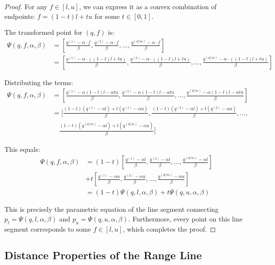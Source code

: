 \documentclass[numbers,sort]{article}
\begin{document}
\begin{proof}
For any $f \in [l, u]$, we can express it as a convex combination of endpoints: $f = (1-t)l + tu$ for some $t \in [0,1]$.

The transformed point for $(q, f)$ is:
\begin{align}
\Psi(q, f, \alpha, \beta) &= [\frac{q^{(1)} - \alpha \cdot f}{\beta}, \frac{q^{(2)} - \alpha \cdot f}{\beta}, ..., \frac{q^{(d/m)} - \alpha \cdot f}{\beta}] \\
&= [\frac{q^{(1)} - \alpha \cdot ((1-t)l + tu)}{\beta}, \frac{q^{(2)} - \alpha \cdot ((1-t)l + tu)}{\beta}, ..., \frac{q^{(d/m)} - \alpha \cdot ((1-t)l + tu)}{\beta}]
\end{align}

Distributing the terms:
\begin{align}
\Psi(q, f, \alpha, \beta) &= [\frac{q^{(1)} - \alpha(1-t)l - \alpha tu}{\beta}, \frac{q^{(2)} - \alpha(1-t)l - \alpha tu}{\beta}, ..., \frac{q^{(d/m)} - \alpha(1-t)l - \alpha tu}{\beta}] \\
&= [\frac{(1-t)(q^{(1)} - \alpha l) + t(q^{(1)} - \alpha u)}{\beta}, \frac{(1-t)(q^{(2)} - \alpha l) + t(q^{(2)} - \alpha u)}{\beta}, ...,\\
&\quad \frac{(1-t)(q^{(d/m)} - \alpha l) + t(q^{(d/m)} - \alpha u)}{\beta}]
\end{align}

This equals:
\begin{align}
\Psi(q, f, \alpha, \beta) &= (1-t)[\frac{q^{(1)} - \alpha l}{\beta}, \frac{q^{(2)} - \alpha l}{\beta}, ..., \frac{q^{(d/m)} - \alpha l}{\beta}] \\&+ t[\frac{q^{(1)} - \alpha u}{\beta}, \frac{q^{(2)} - \alpha u}{\beta}, ..., \frac{q^{(d/m)} - \alpha u}{\beta}] \\
&= (1-t)\Psi(q, l, \alpha, \beta) + t\Psi(q, u, \alpha, \beta)
\end{align}

This is precisely the parametric equation of the line segment connecting $p_l = \Psi(q, l, \alpha, \beta)$ and $p_u = \Psi(q, u, \alpha, \beta)$. Furthermore, every point on this line segment corresponds to some $f \in [l, u]$, which completes the proof.
\end{proof}

\subsection{Distance Properties of the Range Line}
\label{sec:distance-prop}
\end{document}

